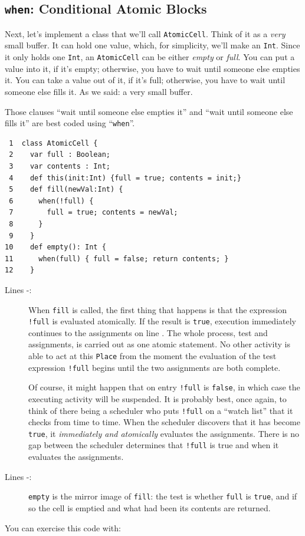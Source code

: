 \subsection{{\tt when}: Conditional Atomic Blocks}\label{ssec:whenstmt}

Next, let's implement a class that we'll call {\tt AtomicCell}.  Think of it as
a {\em very} small buffer. It can hold one value, which, for simplicity, we'll
make an {\tt Int}. Since it only holds one {\tt Int}, an {\tt AtomicCell} can
be either {\em empty} or {\em full}.  You can put a value into it, if it's
empty; otherwise, you have to wait until someone else empties it.  You can take
a value out of it, if it's full; otherwise, you have to wait until someone
else fills it.  As we said: a very small buffer.

Those clauses ``wait until someone else empties it'' and ``wait until someone
else fills it'' are best coded using ``{\tt when}''.  
\begin{verbatim}
 1  class AtomicCell {
 2    var full : Boolean;
 3    var contents : Int;
 4    def this(init:Int) {full = true; contents = init;}
 5    def fill(newVal:Int) {
 6      when(!full) {
 7        full = true; contents = newVal;
 8      }
 9    }
10    def empty(): Int {
11      when(full) { full = false; return contents; }
12    }
\end{verbatim}
\begin{description}
\item[Lines -:]
When {\tt fill} is called, the first thing that happens is that the expression
{\tt !full} is evaluated atomically.  If the result is {\tt true}, execution 
immediately continues to the assignments on line .
The whole process, test and assignments, is carried out as one atomic
statement.  No other activity is able to act at this {\tt Place} from the moment
the evaluation of the test expression {\tt !full} begins until the two assignments
are both complete.  

Of course, it might happen that on entry {\tt !full} is {\tt false}, in which case
the executing activity will be suspended.
It is probably best, once again, to think of there being a 
scheduler who puts {\tt !full}
on a ``watch list'' that it checks from time to time.  When the scheduler discovers that
it has become {\tt true}, it {\em immediately and atomically} evaluates the
assignments.
There is no gap between the scheduler determines 
that {\tt !full} is true and when it evaluates the assignments.

\item[Lines -:]
{\tt empty} is the mirror image of {\tt fill}: the test is whether {\tt full} is
{\tt true}, and if so the cell is emptied and what had been
its contents are returned.
\end{description}
  You can exercise this
code with:

